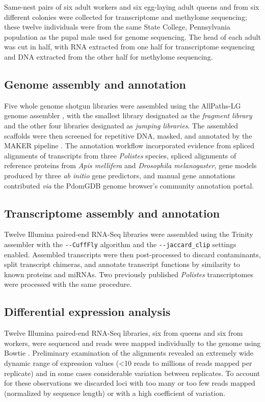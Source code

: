 Same-nest pairs of six adult workers and six egg-laying adult queens and
from six different colonies were collected for transcriptome and
methylome sequencing; these twelve individuals were from the same State
College, Pennsylvania population as the pupal male used for genome
sequencing. The head of each adult was cut in half, with RNA extracted
from one half for transcriptome sequencing and DNA extracted from the
other half for methylome sequencing.

\subsection{Genome assembly and annotation} Five whole genome shotgun
libraries were assembled using the AllPaths-LG genome assembler \cite{AllPathsLG}, with
the smallest library designated as the \textit{fragment library} and the
other four libraries designated as \textit{jumping libraries}. The
assembled scaffolds were then screened for repetitive DNA, masked, and
annotated by the MAKER pipeline \cite{Maker}. The
annotation workflow incorporated evidence from spliced alignments of
transcripts from three \textit{Polistes} species, spliced alignments of
reference proteins from \textit{Apis mellifera} and \textit{Drosophila
melanogaster}, gene models produced by three \textit{ab initio} gene
predictors, and manual gene annotations contributed \textit{via} the
PdomGDB genome browser's community annotation portal.

\subsection{Transcriptome assembly and annotation} Twelve Illumina
paired-end RNA-Seq libraries were assembled using the Trinity assembler \cite{Trinity} with
the \texttt{-\/-CuffFly} algorithm and the \texttt{-\/-jaccard\_clip} settings enabled.
Assembled transcripts were then post-processed to discard contaminants,
split transcript chimeras, and annotate transcript functions by
similarity to known proteins and miRNAs. Two previously published
\textit{Polistes} transcriptomes \cite{Berens2015,PcanTrans} were
processed with the same procedure.

\subsection{Differential expression analysis} Twelve Illumina paired-end
RNA-Seq libraries, six from queens and six from workers, were sequenced
and reads were mapped individually to the genome using Bowtie \cite{Bowtie}.
Preliminary examination of the alignments revealed an extremely wide
dynamic range of expression values (\textless{}10 reads to millions of
reads mapped per replicate) and in some cases considerable variation
between replicates. To account for these observations we discarded loci
with too many or too few reads mapped (normalized by sequence length) or
with a high coefficient of variation.

